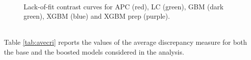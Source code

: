 \documentclass[fleqn,10pt]{wlscirep}
\begin{document}
\begin{figure}[ht]
\centering
{}\quad
{}\quad
{}\\
\quad
{}\quad
{}
\caption{Lack-of-fit contrast curves for APC (red), LC (green), GBM (dark green), XGBM (blue) and XGBM prep (purple).}
\label{fig:lof}
\end{figure}\\
%
Table \ref{tab:avecri} reports the values of the average discrepancy measure for both the base and the boosted models considered in the analysis. 
\end{document}
